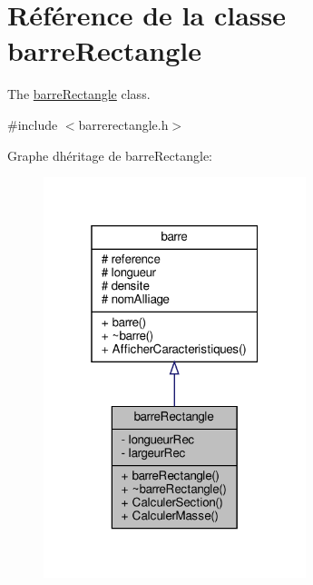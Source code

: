 \hypertarget{classbarre_rectangle}{}\section{Référence de la classe barre\+Rectangle}
\label{classbarre_rectangle}


The \hyperlink{classbarre_rectangle}{barre\+Rectangle} class.  




{\ttfamily \#include $<$barrerectangle.\+h$>$}



Graphe d\textquotesingle{}héritage de barre\+Rectangle\+:
\nopagebreak
\begin{figure}[H]
\begin{center}
\leavevmode
\includegraphics[width=217pt]{classbarre_rectangle__inherit__graph}
\end{center}
\end{figure}


